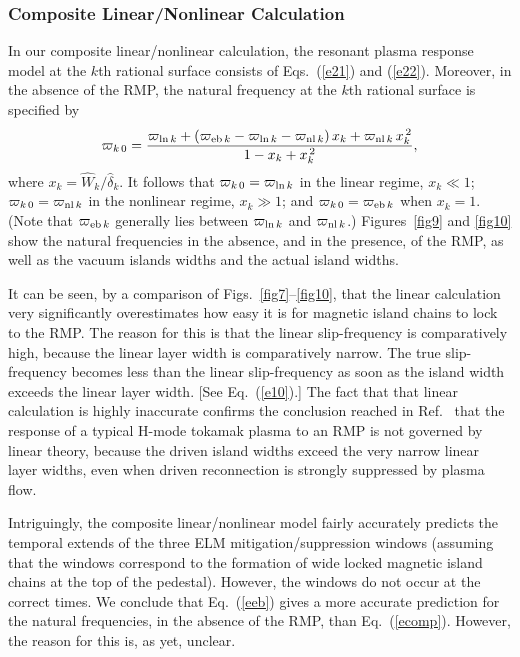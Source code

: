\documentclass[12pt,prb,aps]{revtex4-1}
\begin{document}
\subsubsection{Composite Linear/Nonlinear Calculation}
In our composite linear/nonlinear calculation, the resonant plasma response model at the $k$th rational surface consists of Eqs.~(\ref{e21}) and (\ref{e22}).
Moreover, in the absence of the RMP, the natural frequency at the $k$th rational surface is specified
by 
\begin{equation}\label{ecomp}
\varpi_{k\,0} = \frac{\varpi_{{\rm ln}\,k} +(\varpi_{{\rm eb}\,k} -\varpi_{{\rm ln}\,k}-\varpi_{{\rm nl}\,k})\,x_k + \varpi_{{\rm nl}\,k}\,x_k^{\,2}}{1-x_k +x_k^{\,2}},
\end{equation}
where $x_k = \hat{W}_k/\hat{\delta}_k$. It follows that $\varpi_{k\,0}=\varpi_{{\rm ln}\,k}$ in the linear regime, $x_k\ll 1$;  $\varpi_{k\,0}=\varpi_{{\rm nl}\,k}$ in the nonlinear regime, $x_k\gg 1$; 
and $\varpi_{k\,0}=\varpi_{{\rm eb}\,k}$  when $x_k=1$. (Note that $\varpi_{{\rm eb}\,k}$ generally lies between $\varpi_{{\rm ln}\,k}$ and $\varpi_{{\rm nl}\,k}$.) Figures~\ref{fig9} and \ref{fig10} show the natural frequencies in the absence, and in the presence, of the RMP, as well as the vacuum
islands widths and the actual island widths. 

It can be seen, by a comparison of Figs.~\ref{fig7}--\ref{fig10}, that the linear calculation very significantly overestimates how easy it is for magnetic
island chains to lock to the RMP. The reason for this is that the linear slip-frequency is comparatively high, because the linear layer width is
comparatively narrow. The true slip-frequency becomes less than the linear slip-frequency as soon as the island width exceeds the
linear layer width. [See Eq.~(\ref{e10}).] The fact that that linear calculation is highly inaccurate confirms the conclusion reached in Ref.~
that the response of a typical H-mode tokamak plasma to an RMP is not governed by linear theory, because the driven
island widths exceed the very narrow linear layer widths, even when driven reconnection is strongly suppressed by plasma flow. 

Intriguingly, the composite linear/nonlinear model fairly accurately predicts the temporal extends of the three ELM mitigation/suppression windows (assuming that the
windows correspond to the formation of wide locked magnetic island chains at the top of the pedestal). 
However, the windows do not occur at the correct times. We conclude that Eq.~(\ref{eeb}) gives a more accurate prediction for the
natural frequencies, in the absence of the RMP, than Eq.~(\ref{ecomp}). However, the reason for this is, as yet, unclear. 
\end{document}
